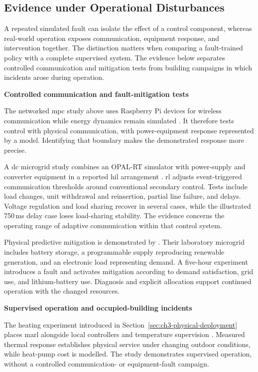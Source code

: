 \subsection{Evidence under Operational Disturbances}
\label{sec:ch3-disturbance-evidence}

A repeated simulated fault can isolate the effect of a control component, whereas real-world operation exposes communication, equipment response, and intervention together. The distinction matters when comparing a fault-trained policy with a complete supervised system. The evidence below separates controlled communication and mitigation tests from building campaigns in which incidents arose during operation.

\smallskip
\noindent\textbf{Controlled communication and fault-mitigation tests}\par\nobreak\smallskip
The networked \gls{mpc} study above uses Raspberry Pi devices for wireless communication while energy dynamics remain simulated \parencite{qiu2021set}. It therefore tests control with physical communication, with power-equipment response represented by a model. Identifying that boundary makes the demonstrated response more precise.

A \gls{dc} microgrid study combines an OPAL-RT simulator with power-supply and converter equipment in a reported \gls{hil} arrangement \parencite{negahdar2024event}. \gls{rl} adjusts event-triggered communication thresholds around conventional secondary control. Tests include load changes, unit withdrawal and reinsertion, partial line failure, and delays. Voltage regulation and load sharing recover in several cases, while the illustrated 750\,ms delay case loses load-sharing stability. The evidence concerns the operating range of adaptive communication within that control system.

Physical predictive mitigation is demonstrated by \textcite{zafra2023fault}. Their laboratory microgrid includes battery storage, a programmable supply reproducing renewable generation, and an electronic load representing demand. A five-hour experiment introduces a fault and activates mitigation according to demand satisfaction, grid use, and lithium-battery use. Diagnosis and explicit allocation support continued operation with the changed resources.

\smallskip
\noindent\textbf{Supervised operation and occupied-building incidents}\par\nobreak\smallskip
The heating experiment introduced in Section~\ref{sec:ch3-physical-deployment} places \gls{marl} alongside local controllers and temperature supervision \parencite{blad2023laboratory}. Measured thermal response establishes physical service under changing outdoor conditions, while heat-pump cost is modelled. The study demonstrates supervised operation, without a controlled communication- or equipment-fault campaign.

